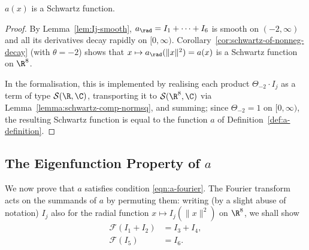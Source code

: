 \begin{proposition}\label{prop:a-schwartz}\leanok
{}
$a(x)$ is a Schwartz function.
\end{proposition}
\begin{proof}
By Lemma~\ref{lem:Ij-smooth}, $a_\rad = I_1 + \cdots + I_6$ is smooth on $(-2, \infty)$ and all its derivatives decay rapidly on $[0, \infty)$. Corollary~\ref{cor:schwartz-of-nonneg-decay} (with $\theta = -2$) shows that $x \mapsto a_\rad(\|x\|^2) = a(x)$ is a Schwartz function on $\R^8$.

In the formalisation, this is implemented by realising each product $\Theta_{-2} \cdot I_j$ as a term of type $\mathcal{S}(\R, \C)$, transporting it to $\mathcal{S}(\R^8, \C)$ via Lemma~\ref{lemma:schwartz-comp-normsq}, and summing; since $\Theta_{-2} = 1$ on $[0, \infty)$, the resulting Schwartz function is equal to the function $a$ of Definition~\ref{def:a-definition}.
\end{proof}

\subsection{The Eigenfunction Property of $a$}

We now prove that $a$ satisfies condition \eqref{eqn:a-fourier}. The Fourier transform acts on the summands of $a$ by permuting them: writing (by a slight abuse of notation) $I_j$ also for the radial function $x \mapsto I_j(\|x\|^2)$ on $\R^8$, we shall show
\begin{align}
    \mathcal{F}(I_1 + I_2) &= I_3 + I_4, \label{eqn:a-perm-12}\\
    \mathcal{F}(I_5) &= I_6. \label{eqn:a-perm-56}
\end{align}

